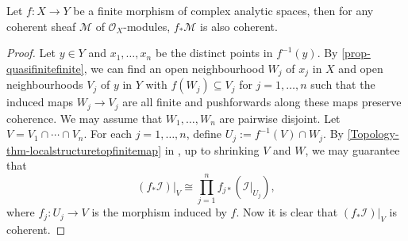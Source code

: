 \begin{theorem}\label{thm-finitepushcoherent}
    Let $f:X\rightarrow Y$ be a finite morphism of complex analytic spaces, then for any coherent sheaf $\mathcal{M}$ of $\mathcal{O}_X$-modules, $f_*\mathcal{M}$ is also coherent.
\end{theorem}
\begin{proof}
    Let $y\in Y$ and $x_1,\ldots,x_n$ be the distinct points in $f^{-1}(y)$. By \cref{prop-quasifinitefinite}, we can find an open neighbourhood $W_j$ of $x_j$ in $X$ and open neighbourhoods $V_j$ of $y$ in $Y$ with $f(W_j)\subseteq V_j$ for $j=1,\ldots,n$ such that the induced maps $W_j\rightarrow V_j$ are all finite and pushforwards along these maps preserve coherence. We may assume that $W_1,\ldots,W_n$ are pairwise disjoint.
    Let $V=V_1\cap \cdots\cap V_n$. For each $j=1,\ldots,n$, define $U_j:=f^{-1}(V)\cap W_j$. By \cref{Topology-thm-localstructuretopfinitemap} in , up to shrinking $V$ and $W$, we may guarantee that
    \[
        (f_*\mathcal{I})|_V\cong \prod_{j=1}^n f_{j*}(\mathcal{I}|_{U_j}),
    \]
    where $f_j:U_j\rightarrow V$ is the morphism induced by $f$. Now it is clear that $(f_*\mathcal{I})|_V$ is coherent.
\end{proof}



\cite{stacks-project}

\printbibliography
